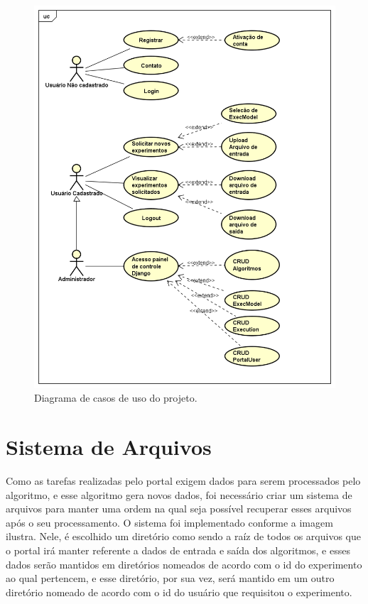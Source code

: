 \documentclass[tg]{mdtufsm}
\begin{document}
\begin{figure}
	\centering
	\includegraphics[width=1\textwidth]{UseCase_tg}
	\caption{
		Diagrama de casos de uso do projeto.
	}
	\label{fig:path_tracing}
\end{figure}

\section{Sistema de Arquivos}
Como as tarefas realizadas pelo portal exigem dados para serem processados pelo algoritmo, e esse algoritmo gera novos dados, foi necessário criar um sistema de arquivos para manter uma ordem na qual seja possível recuperar esses arquivos após o seu processamento.
O sistema foi implementado conforme a imagem ilustra. Nele, é escolhido um diretório como sendo a raíz de todos os arquivos que o portal irá manter referente a dados de entrada e saída dos algoritmos, e esses dados serão mantidos em diretórios nomeados de acordo com o id do experimento ao qual pertencem, e esse diretório, por sua vez, será mantido em um outro diretório nomeado de acordo com o id do usuário que requisitou o experimento.
\end{document}
